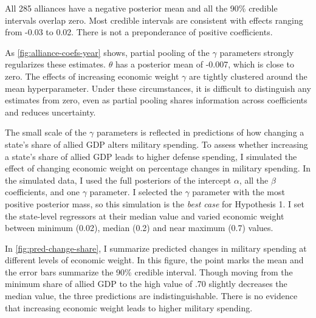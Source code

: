 \documentclass[12pt]{article}
\begin{document}
All 285 alliances have a negative posterior mean and all the 90\% credible intervals overlap zero. 
Most credible intervals are consistent with effects ranging from -0.03 to 0.02. 
There is not a preponderance of positive coefficients. 


As \autoref{fig:alliance-coefs-year} shows, partial pooling of the $\gamma$ parameters strongly regularizes these estimates. 
$\theta$ has a posterior mean of -0.007, which is close to zero. 
The effects of increasing economic weight $\gamma$ are tightly clustered around the mean hyperparameter. 
Under these circumstances, it is difficult to distinguish any estimates from zero, even as partial pooling shares information across coefficients and reduces uncertainty. 


The small scale of the $\gamma$ parameters is reflected in predictions of how changing a state's share of allied GDP alters military spending. 
To assess whether increasing a state's share of allied GDP leads to higher defense spending, I simulated the effect of changing economic weight on percentage changes in military spending. 
In the simulated data, I used the full posteriors of the intercept $\alpha$, all the $\beta$ coefficients, and one $\gamma$ parameter. 
I selected the $\gamma$ parameter with the most positive posterior mass, so this simulation is the \emph{best case} for Hypothesis 1. 
I set the state-level regressors at their median value and varied economic weight between minimum (0.02), median (0.2) and near maximum (0.7) values. 


In \autoref{fig:pred-change-share}, I summarize predicted changes in military spending at different levels of economic weight. 
In this figure, the point marks the mean and the error bars summarize the 90\% credible interval. 
Though moving from the minimum share of allied GDP to the high value of .70 slightly decreases the median value, the three predictions are indistinguishable. 
There is no evidence that increasing economic weight leads to higher military spending. 
\end{document}
